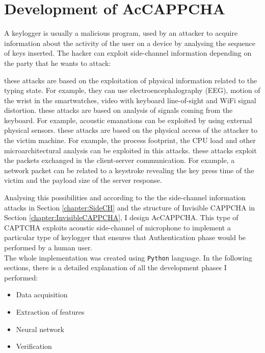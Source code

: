 \chapter{Development of AcCAPPCHA}
A keylogger is usually a malicious program, used by an attacker to acquire information about the activity of the user on a device by analysing the sequence of keys inserted. The hacker can exploit side-channel information depending on the party that he wants to attack\cite{keylogging}:
\begin{itemize}
{these attacks are based on the exploitation of physical information related to the typing state. For example, they can use electroencephalography (EEG), motion of the wrist in the smartwatches, video with keyboard line-of-sight and WiFi signal distortion.}
{these attacks are based on analysis of signals coming from the keyboard. For example, acoustic emanations can be exploited by using external physical sensors.}
{these attacks are based on the physical access of the attacker to the victim machine. For example, the process footprint, the CPU load and other microarchitectural analysis can be exploited in this attacks.}
{these attacks exploit the packets exchanged in the client-server communication. For example, a network packet can be related to a keystroke revealing the key press time of the victim and the payload size of the server response.}
\end{itemize}
Analysing this possibilities and according to the the side-channel information attacks in Section \ref{chapter:SideCH} and the structure of Invisible CAPPCHA in Section \ref{chapter:InvisibleCAPPCHA}, I design AcCAPPCHA. This type of CAPTCHA exploits acoustic side-channel of microphone to implement a particular type of keylogger that ensures that Authentication phase would be performed by a human user.\\
The whole implementation was created using \texttt{Python} language. In the following sections, there is a detailed explanation of all the development phases I performed:
\begin{itemize}
\item{Data acquisition}
\item{Extraction of features}
\item{Neural network}
\item{Verification}
\end{itemize}

